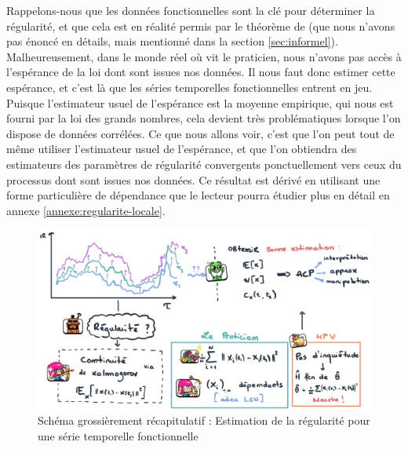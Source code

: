 Rappelons-nous que les données fonctionnelles sont la clé pour déterminer la régularité, et que cela est en réalité permis par le théorème de  (que nous n'avons pas énoncé en détails, mais mentionné dans la section \ref{sec:informel}). Malheureusement, dans le monde réel où vit le praticien, nous n'avons pas accès à l'espérance de la loi dont sont issues nos données. Il nous faut donc estimer cette espérance, et c'est là que les séries temporelles fonctionnelles entrent en jeu. Puisque l'estimateur usuel de l'espérance est la moyenne empirique, qui nous est fourni par la loi des grands nombres, cela devient très problématiques lorsque l'on dispose de données corrélées.
Ce que nous allons voir, c'est que l'on peut tout de même utiliser l'estimateur usuel de l'espérance, et que l'on obtiendra des estimateurs des paramètres de régularité convergents ponctuellement vers ceux du processus dont sont issues nos données. Ce résultat est dérivé en utilisant une forme particulière de dépendance que le lecteur pourra étudier plus en détail en annexe \ref{annexe:regularite-locale}.

\begin{figure}[H]
	\centering
	\includegraphics[width=\textwidth]{Images/sketches/schema_ts_estim_reg.jpg}
	\caption{Schéma grossièrement récapitulatif : Estimation de la régularité pour une série temporelle fonctionnelle}
	\label{fig:recap_estim_reg_fts}
\end{figure}
